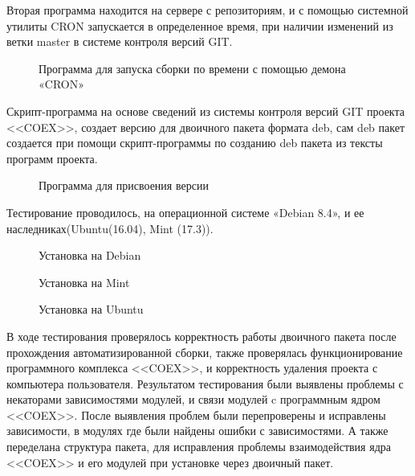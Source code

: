 Вторая программа находится на сервере с репозиториям, и с помощью системной утилиты CRON запускается в определенное время, при наличии изменений из ветки master в системе контроля версий GIT.

\begin{figure}[h!]
\caption{ Программа  для запуска сборки по времени  с помощью демона  «CRON» }
\label{ser_2:ser_2}
\end{figure}

Скрипт-программа на основе сведений из системы контроля версий GIT проекта <<COEX>>, создает версию для двоичного пакета формата deb, сам deb пакет создается при помощи скрипт-программы по созданию  deb пакета из тексты программ проекта.

\begin{figure}[h!]
\caption{ Программа для присвоения версии }
\label{ser_3:ser_3}
\end{figure}

Тестирование проводилось, на операционной системе «Debian 8.4», и ее наследниках(Ubuntu(16.04), Mint (17.3)).

\begin{figure}[h!]
\caption{ Установка на Debian }
\label{ser_4:ser_4}
\end{figure}

\begin{figure}[h!]
\caption{ Установка на Mint }
\label{ser_5:ser_5}
\end{figure}

\begin{figure}[h!]
\caption{ Установка на Ubuntu }
\label{ser_6:ser_6}
\end{figure}

В ходе тестирования проверялось корректность работы двоичного пакета после прохождения автоматизированной сборки, также проверялась функционирование программного комплекса <<COEX>>, и корректность удаления проекта с компьютера пользователя. Результатом тестирования были выявлены проблемы с некаторами зависимостями модулей, и связи модулей c программным ядром <<COEX>>. После выявления проблем были перепроверены и исправлены зависимости, в модулях где были найдены ошибки с зависимостями. А также переделана структура пакета, для исправления проблемы взаимодействия ядра <<COEX>> и его модулей при установке через двоичный пакет.  

\clearpage
